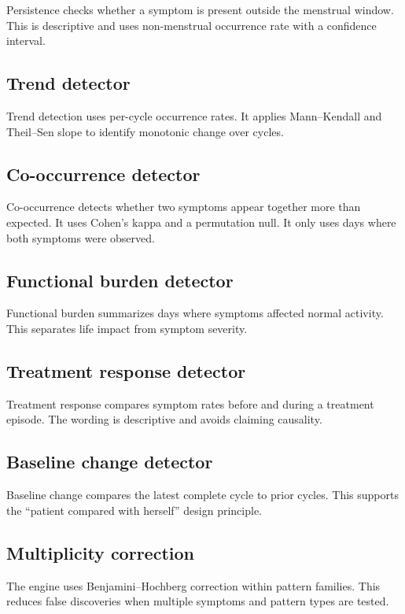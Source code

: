 \documentclass[11pt,a4paper]{article}
\begin{document}
Persistence checks whether a symptom is present outside the menstrual window. This is descriptive and uses non-menstrual occurrence rate with a confidence interval.

\subsection{Trend detector}

Trend detection uses per-cycle occurrence rates. It applies Mann--Kendall and Theil--Sen slope to identify monotonic change over cycles.

\subsection{Co-occurrence detector}

Co-occurrence detects whether two symptoms appear together more than expected. It uses Cohen's kappa and a permutation null. It only uses days where both symptoms were observed.

\subsection{Functional burden detector}

Functional burden summarizes days where symptoms affected normal activity. This separates life impact from symptom severity.

\subsection{Treatment response detector}

Treatment response compares symptom rates before and during a treatment episode. The wording is descriptive and avoids claiming causality.

\subsection{Baseline change detector}

Baseline change compares the latest complete cycle to prior cycles. This supports the ``patient compared with herself'' design principle.

\subsection{Multiplicity correction}

The engine uses Benjamini--Hochberg correction within pattern families. This reduces false discoveries when multiple symptoms and pattern types are tested.
\end{document}
